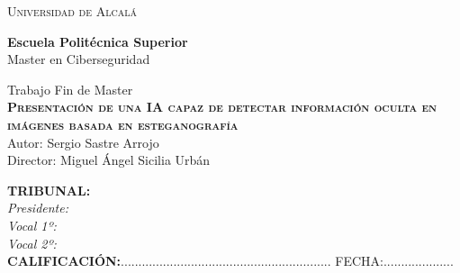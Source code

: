 
\begin{center}
\LARGE \textsc{Universidad de Alcalá}\\
\vspace{0.5cm}

\textbf{Escuela Politécnica Superior}\\

Master en Ciberseguridad
\end{center}

\vspace{0.5cm}

\begin{center}
\end{center}


\begin{center}
\vspace{1cm}

\LARGE Trabajo Fin de Master\\
\textbf{\Huge \textsc{{Presentación de una IA capaz de detectar información oculta en imágenes basada en esteganografía}}}\\
\vspace{0.5cm}
\large Autor: Sergio Sastre Arrojo\\
Director: Miguel Ángel Sicilia Urbán\\
\vspace{0.5cm}
\end{center}

\begin{flushleft}
\textbf{TRIBUNAL:}\\
\vspace{1.5cm}
\textit{Presidente: }\\
\vspace{1.5cm}
\textit{Vocal 1º: }\\
\vspace{1.5cm}
\textit{Vocal 2º: }\\
\vspace{1.5cm}
\textbf{CALIFICACIÓN:}............................................................ FECHA:.................... \\
\end{flushleft}

\newpage
\thispagestyle{empty}
\hspace*{0.5cm}
\newpage

